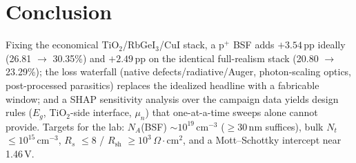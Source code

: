 \documentclass[review]{elsarticle}
\begin{document}
\section{Conclusion}
Fixing the economical TiO$_{2}$/RbGeI$_{3}$/CuI stack, a p$^{+}$ BSF adds $+3.54$\,pp ideally (26.81 $\rightarrow$ 30.35\%) and $+2.49$\,pp on the identical full-realism stack (20.80 $\rightarrow$ 23.29\%); the loss waterfall (native defects/radiative/Auger, photon-scaling optics, post-processed parasitics) replaces the idealized headline with a fabricable window; and a SHAP sensitivity analysis over the campaign data yields design rules ($E_{g}$, TiO$_{2}$-side interface, $\mu_{n}$) that one-at-a-time sweeps alone cannot provide. Targets for the lab: $N_{A}$(BSF) $\sim$$10^{19}$\,cm$^{-3}$ ($\ge$30\,nm suffices), bulk $N_{t}$ $\le$$10^{15}$\,cm$^{-3}$, $R_{s}$ $\le$8 / $R_{\mathrm{sh}}$ $\ge$$10^{3}$\,$\Omega\cdot$cm$^{2}$, and a Mott--Schottky intercept near 1.46\,V.
\end{document}
